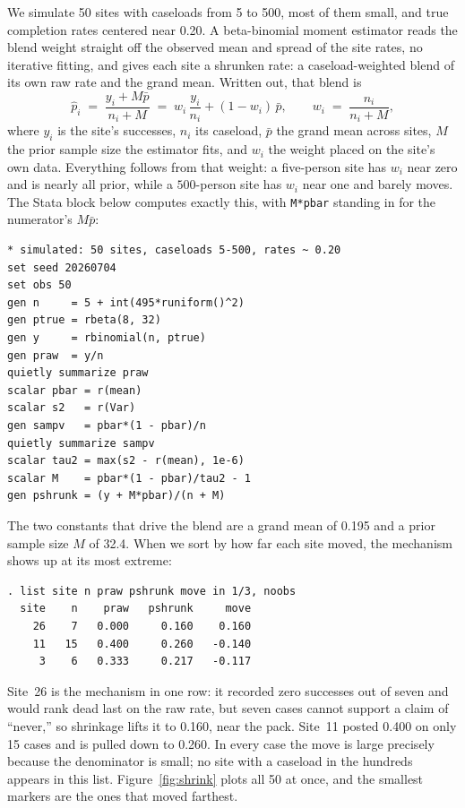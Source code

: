 \documentclass[
    a4paper,
    fontsize=10pt,
    twoside=true,
    numbers=noenddot,
]{kaobook}
\begin{document}
We simulate 50 sites with caseloads from 5 to 500, most of them small, and true completion rates centered near 0.20. A beta-binomial moment estimator reads the blend weight straight off the observed mean and spread of the site rates, no iterative fitting, and gives each site a shrunken rate: a caseload-weighted blend of its own raw rate and the grand mean. Written out, that blend is
\begin{equation}
  \hat p_i \;=\; \frac{y_i + M\bar p}{n_i + M}
           \;=\; w_i\,\frac{y_i}{n_i} + (1-w_i)\,\bar p,
  \qquad
  w_i \;=\; \frac{n_i}{n_i + M},
  \label{eq:ch07-viz-shrink}
\end{equation}
where $y_i$ is the site's successes, $n_i$ its caseload, $\bar p$ the grand mean across sites, $M$ the prior sample size the estimator fits, and $w_i$ the weight placed on the site's own data. Everything follows from that weight: a five-person site has $w_i$ near zero and is nearly all prior, while a $500$-person site has $w_i$ near one and barely moves. The Stata block below computes exactly this, with \texttt{M*pbar} standing in for the numerator's $M\bar p$:
\par
{\footnotesize
\begin{verbatim}
* simulated: 50 sites, caseloads 5-500, rates ~ 0.20
set seed 20260704
set obs 50
gen n     = 5 + int(495*runiform()^2)
gen ptrue = rbeta(8, 32)
gen y     = rbinomial(n, ptrue)
gen praw  = y/n
quietly summarize praw
scalar pbar = r(mean)
scalar s2   = r(Var)
gen sampv   = pbar*(1 - pbar)/n
quietly summarize sampv
scalar tau2 = max(s2 - r(mean), 1e-6)
scalar M    = pbar*(1 - pbar)/tau2 - 1
gen pshrunk = (y + M*pbar)/(n + M)
\end{verbatim}
}
The two constants that drive the blend are a grand mean of 0.195 and a prior sample size $M$ of 32.4. When we sort by how far each site moved, the mechanism shows up at its most extreme:
\par
{\footnotesize
\begin{verbatim}
. list site n praw pshrunk move in 1/3, noobs
  site    n    praw   pshrunk     move
    26    7   0.000     0.160    0.160
    11   15   0.400     0.260   -0.140
     3    6   0.333     0.217   -0.117
\end{verbatim}
}
Site~26 is the mechanism in one row: it recorded zero successes out of seven and would rank dead last on the raw rate, but seven cases cannot support a claim of \enquote{never,} so shrinkage lifts it to 0.160, near the pack. Site~11 posted 0.400 on only 15 cases and is pulled down to 0.260. In every case the move is large precisely because the denominator is small; no site with a caseload in the hundreds appears in this list. Figure~\ref{fig:shrink} plots all 50 at once, and the smallest markers are the ones that moved farthest.
\end{document}

